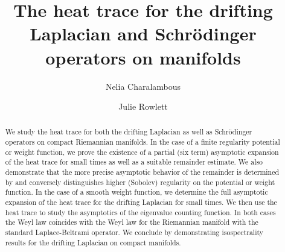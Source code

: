 \documentclass[letterpaper,12pt]{amsart}
\begin{document}




\title[Heat trace for drifting Laplacian and Schr\"odinger operators]{The heat trace for the drifting Laplacian and Schr\"odinger operators on manifolds}


\author{Nelia Charalambous}

\author{Julie Rowlett}




\begin{abstract} We study the heat trace for both the drifting Laplacian  as well as Schr\"odinger operators on compact Riemannian manifolds. In the case of a finite regularity potential or weight function, we prove the existence of a partial (six term) asymptotic expansion of the heat trace for small times as well as a suitable remainder estimate.  We also demonstrate that the more precise asymptotic behavior of the remainder is determined by and conversely distinguishes higher (Sobolev) regularity on the potential or weight function.  In the case of a smooth weight function, we determine the full asymptotic expansion of the heat trace for the drifting Laplacian for small times. We then use the heat trace to study the asymptotics of the eigenvalue counting function. In both cases the Weyl law coincides with the Weyl law for the Riemannian manifold with the standard Laplace-Beltrami operator.  We conclude by demonstrating isospectrality results for the drifting Laplacian on compact manifolds.
\end{abstract}


\maketitle
\end{document}

